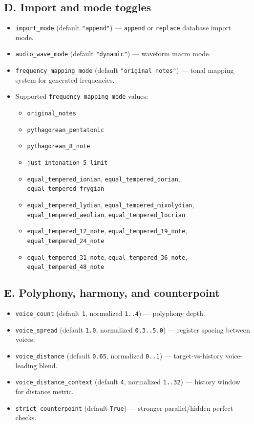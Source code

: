 \documentclass[11pt,a4paper]{article}
\begin{document}
\subsection*{D. Import and mode toggles}
\begin{itemize}
  \item \texttt{import\_mode} (default \texttt{"append"}) --- \texttt{append} or \texttt{replace} database import mode.
  \item \texttt{audio\_wave\_mode} (default \texttt{"dynamic"}) --- waveform macro mode.
  \item \texttt{frequency\_mapping\_mode} (default \texttt{"original\_notes"}) --- tonal mapping system for generated frequencies.
  \item Supported \texttt{frequency\_mapping\_mode} values:
  \begin{itemize}
    \item \texttt{original\_notes}
    \item \texttt{pythagorean\_pentatonic}
    \item \texttt{pythagorean\_8\_note}
    \item \texttt{just\_intonation\_5\_limit}
    \item \texttt{equal\_tempered\_ionian}, \texttt{equal\_tempered\_dorian}, \texttt{equal\_tempered\_frygian}
    \item \texttt{equal\_tempered\_lydian}, \texttt{equal\_tempered\_mixolydian}, \texttt{equal\_tempered\_aeolian}, \texttt{equal\_tempered\_locrian}
    \item \texttt{equal\_tempered\_12\_note}, \texttt{equal\_tempered\_19\_note}, \texttt{equal\_tempered\_24\_note}
    \item \texttt{equal\_tempered\_31\_note}, \texttt{equal\_tempered\_36\_note}, \texttt{equal\_tempered\_48\_note}
  \end{itemize}
\end{itemize}

\subsection*{E. Polyphony, harmony, and counterpoint}
\begin{itemize}
  \item \texttt{voice\_count} (default \texttt{1}, normalized \texttt{1..4}) --- polyphony depth.
  \item \texttt{voice\_spread} (default \texttt{1.0}, normalized \texttt{0.3..5.0}) --- register spacing between voices.
  \item \texttt{voice\_distance} (default \texttt{0.65}, normalized \texttt{0..1}) --- target-vs-history voice-leading blend.
  \item \texttt{voice\_distance\_context} (default \texttt{4}, normalized \texttt{1..32}) --- history window for distance metric.
  \item \texttt{strict\_counterpoint} (default \texttt{True}) --- stronger parallel/hidden perfect checks.
\end{itemize}
\end{document}
